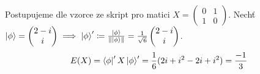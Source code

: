 \documentclass[12pt, a4paper]{article}
\begin{document}
\section{}
Postupujeme dle vzorce ze skript pro matici $X = \begin{pmatrix}
0 & 1 \\
1 & 0
\end{pmatrix}$. Nechť $\ket{\phi} = \begin{pmatrix} 2-i \\ i \end{pmatrix} \implies \ket{\phi}' \coloneqq \frac{\ket{\phi}}{\lVert \ket{\phi} \rVert} = \frac{1}{\sqrt{6}} \begin{pmatrix}
2-i \\ i 
\end{pmatrix}$.
\begin{gather*}
E(X) = \bra{\phi}' X \ket{\phi}' = \frac{1}{6} (2i + i^2 -2i + i^2) = \frac{-1}{3}
\end{gather*}
\end{document}
